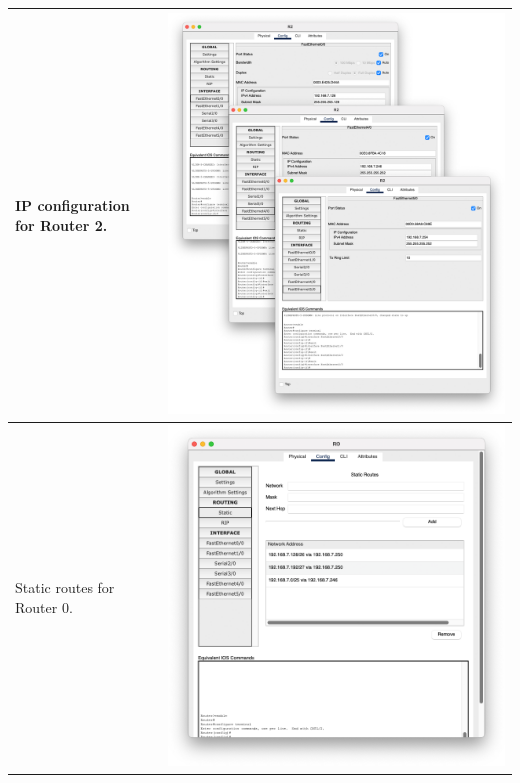\documentclass[11pt,a4paper]{report}
\begin{document}
\begin{flushleft}
\begin{center}
\begin{longtable}{ m{5cm} l }
                        IP configuration for Router 2.  & \includegraphics[scale=0.245 ,valign=c]{r2-ipall}                      \\ \hline
                        Static routes for Router 0.     & \includegraphics[scale=0.35  ,valign=c]{r0-staticroute}                \\ \hline

\end{longtable}
\end{center}
\end{flushleft}
\end{document}
